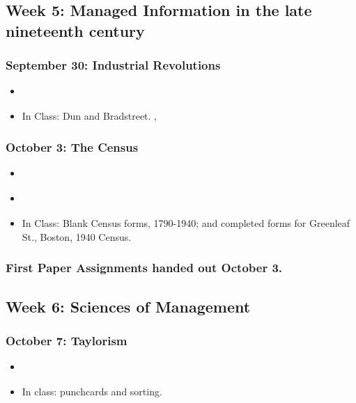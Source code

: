 \subsection{Week 5: Managed Information in the late nineteenth century}

\subsubsection{September 30: Industrial Revolutions}

\begin{itemize}
\item
  \cite[Chapter 6, "Industrial Revolution and the Crisis of Control"]{beniger_control_1986}
\item
  In Class: Dun and Bradstreet. \cite{t._mercantile_1851},
  \cite{j._mercantile_1851}
\end{itemize}

\subsubsection{October 3: The Census}

\begin{itemize}
\item
  \cite{kinnahan_charting_2008}
\item
  \cite[Chapters 3 to 5]{anderson_american_1988}
\item
  In Class: Blank Census forms, 1790-1940; and completed forms for
  Greenleaf St., Boston, 1940 Census.
\end{itemize}

\subsubsection{First Paper Assignments handed out October 3.}

\subsection{Week 6: Sciences of Management}

\subsubsection{October 7: Taylorism}

\begin{itemize}
\item
  \cite{taylor_principles_2006}
\item
  In class: punchcards and sorting.
\end{itemize}

